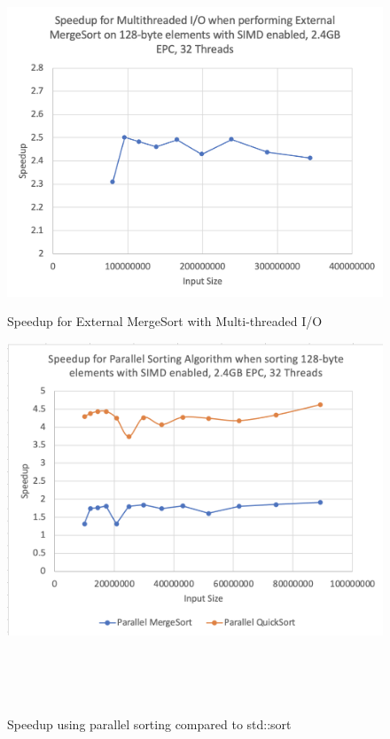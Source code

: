 \documentclass[final,hyperref={pdfpagelabels=false}]{beamer}
\begin{document}
\begin{frame}
\begin{columns}[t]
\begin{column}{.30\linewidth}
    \begin{figure}[h]
        \centering
        \begin{minipage}{0.48\linewidth}
            \includegraphics[width=\linewidth]{assets/sorting.png}
            \caption{Speedup for External MergeSort with Multi-threaded I/O}
        \end{minipage}
        \hfill
        \begin{minipage}{0.48\linewidth}
            \includegraphics[width=\linewidth]{assets/sort.png}
            \caption{Speedup using parallel sorting compared to std::sort}
        \end{minipage} \\ \\  \\

\end{figure}
\end{column}
\end{columns}
\end{frame}
\end{document}
